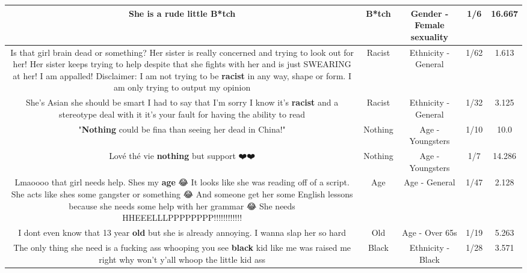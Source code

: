 \documentclass[11pt]{article}
\newlength\mylength
\begin{document}
\begin{center}
\begin{longtable}{|C{.65\mylength}|C{.30\mylength}|C{.12\mylength}|C{.12\mylength}|C{.12\mylength}|}
  \small She is a rude little B*tch\normalsize   & B*tch & Gender - Female sexuality & 1/6 & 16.667 \\  \hline
  \small Is that girl brain dead or something? Her sister is really concerned and trying to look out for her! Her sister keeps trying to help despite that she fights with her  and is just SWEARING at her! I am appalled! Disclaimer: I am not trying to be \textbf{racist} in any way, shape or form. I am only trying to output my opinion\normalsize   & Racist & Ethnicity - General & 1/62 & 1.613 \\  \hline
  \small She's Asian she should be smart I had to say that I'm sorry I know it's \textbf{racist} and a stereotype deal with it it's your fault for having the ability to read\normalsize   & Racist & Ethnicity - General & 1/32 & 3.125 \\  \hline
  \small "\textbf{Nothing} could be fina than seeing her dead in China!"\normalsize   & Nothing & Age - Youngsters & 1/10 & 10.0 \\  \hline
  \small Lové thé vie \textbf{nothing} but support ❤️❤️\normalsize   & Nothing & Age - Youngsters & 1/7 & 14.286 \\  \hline
  \small Lmaoooo that girl needs help. Shes my \textbf{age} 😂 It looks like she was reading off of a script. She acts like shes some gangster or something 😂 And someone get her some English lessons because she needs some help with her grammar 😂 She needs HHEEELLLPPPPPPPP!!!!!!!!!!!!\normalsize   & Age & Age - General & 1/47 & 2.128 \\  \hline
  \small I dont even know that 13 year \textbf{old} but she is already annoying. I wanna slap her so hard\normalsize   & Old & Age - Over 65s & 1/19 & 5.263 \\  \hline
  \small The only thing she need is a fucking ass whooping you see \textbf{black} kid like me was raised me right why won't y'all whoop the little kid ass\normalsize   & Black & Ethnicity - Black & 1/28 & 3.571 \\  \hline

\end{longtable}
\end{center}
\end{document}
